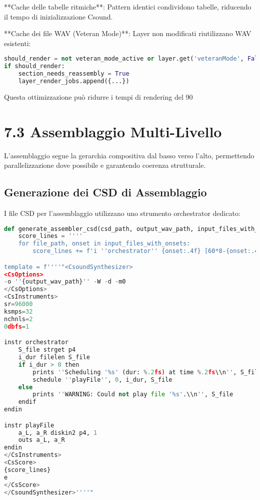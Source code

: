 **Cache delle tabelle ritmiche**: Pattern identici condividono tabelle, riducendo il tempo di inizializzazione Csound.

**Cache dei file WAV (Veteran Mode)**: Layer non modificati riutilizzano WAV esistenti:

\begin{lstlisting}[language=Python]
should_render = not veteran_mode_active or layer.get('veteranMode', False)
if should_render:
    section_needs_reassembly = True
    layer_render_jobs.append({...})
\end{lstlisting}

Questa ottimizzazione può ridurre i tempi di rendering del 90%
\section{7.3 Assemblaggio Multi-Livello}
L'assemblaggio segue la gerarchia compositiva dal basso verso l'alto, permettendo parallelizzazione dove possibile e garantendo coerenza strutturale.
\subsection{Generazione dei CSD di Assemblaggio}
I file CSD per l'assemblaggio utilizzano uno strumento orchestrator dedicato:

\begin{lstlisting}[language=Python]
def generate_assembler_csd(csd_path, output_wav_path, input_files_with_onsets, title=''Assembler''):
    score_lines = ''''
    for file_path, onset in input_files_with_onsets:
        score_lines += f'i ''orchestrator'' {onset:.4f} [60*8-{onset:.4f}] ''{file_path}''\n'

template = f''''"<CsoundSynthesizer>
<CsOptions>
-o ''{output_wav_path}'' -W -d -m0
</CsOptions>
<CsInstruments>
sr=96000
ksmps=32
nchnls=2
0dbfs=1

instr orchestrator
    S_file strget p4
    i_dur filelen S_file
    if i_dur > 0 then
        prints ''Scheduling '%s' (dur: %.2fs) at time %.2fs\\n'', S_file, i_dur, p2
        schedule ''playFile'', 0, i_dur, S_file
    else
        prints ''WARNING: Could not play file '%s'.\\n'', S_file
    endif
endin

instr playFile
    a_L, a_R diskin2 p4, 1
    outs a_L, a_R
endin
</CsInstruments>
<CsScore>
{score_lines}
e
</CsScore>
</CsoundSynthesizer>''''"
\end{lstlisting}

